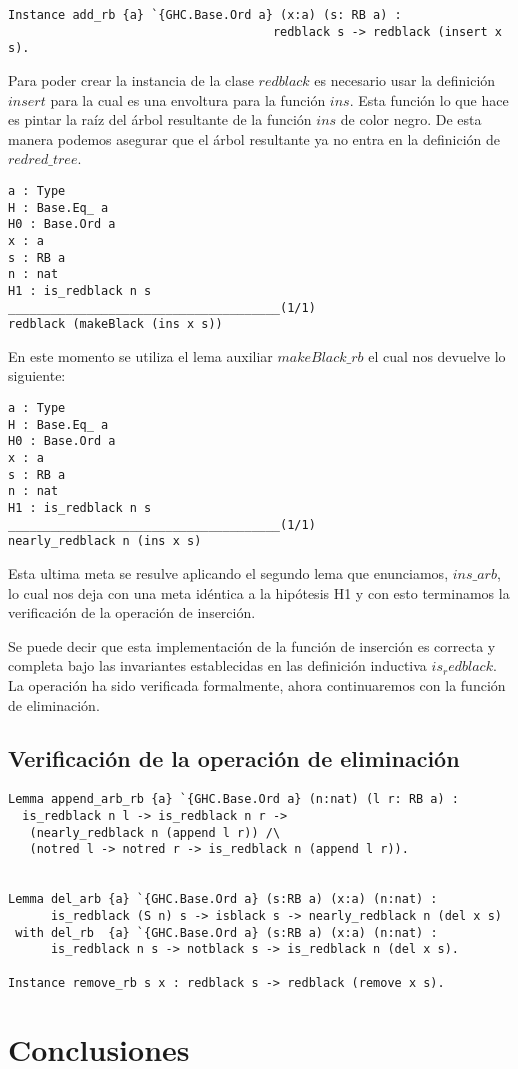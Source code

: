 \documentclass[letterpaper,12pt,oneside]{book}
\theoremstyle{plain}
\theoremstyle{definition}
\theoremstyle{remark}
\begin{document}
\begin{verbatim}
Instance add_rb {a} `{GHC.Base.Ord a} (x:a) (s: RB a) :
                                     redblack s -> redblack (insert x s).
\end{verbatim}

Para poder crear la instancia de la clase $redblack$ es necesario usar la definici\'on $insert$ para la cual es una 
envoltura para la funci\'on $ins$. Esta funci\'on lo que hace es pintar la ra\'iz del \'arbol resultante de la 
funci\'on $ins$ de color negro. De esta manera podemos asegurar que el \'arbol resultante ya no entra en la 
definici\'on de $redred\_tree$.

\begin{verbatim}
a : Type
H : Base.Eq_ a
H0 : Base.Ord a
x : a
s : RB a
n : nat
H1 : is_redblack n s
______________________________________(1/1)
redblack (makeBlack (ins x s))
\end{verbatim}

En este momento se utiliza el lema auxiliar $makeBlack\_rb$ el cual nos devuelve lo siguiente:

\begin{verbatim}
a : Type
H : Base.Eq_ a
H0 : Base.Ord a
x : a
s : RB a
n : nat
H1 : is_redblack n s
______________________________________(1/1)
nearly_redblack n (ins x s)
\end{verbatim}

Esta ultima meta se resulve aplicando el segundo lema que enunciamos, $ins\_arb$, lo cual nos deja con una meta 
idéntica a la hipótesis H1 y con esto terminamos la verificaci\'on de la operaci\'on de inserci\'on.

Se puede decir que esta implementaci\'on de la funci\'on de inserci\'on es correcta y completa bajo las invariantes 
establecidas en las definici\'on inductiva $is_redblack$. La operaci\'on ha sido verificada formalmente, ahora 
continuaremos con la funci\'on de eliminaci\'on.  

\section{Verificación de la operación de eliminación}
\begin{verbatim}
Lemma append_arb_rb {a} `{GHC.Base.Ord a} (n:nat) (l r: RB a) : 
  is_redblack n l -> is_redblack n r ->
   (nearly_redblack n (append l r)) /\
   (notred l -> notred r -> is_redblack n (append l r)).


Lemma del_arb {a} `{GHC.Base.Ord a} (s:RB a) (x:a) (n:nat) :
      is_redblack (S n) s -> isblack s -> nearly_redblack n (del x s)
 with del_rb  {a} `{GHC.Base.Ord a} (s:RB a) (x:a) (n:nat) :
      is_redblack n s -> notblack s -> is_redblack n (del x s).

Instance remove_rb s x : redblack s -> redblack (remove x s).
\end{verbatim}
\chapter{Conclusiones}  
\backmatter%
\end{document}
